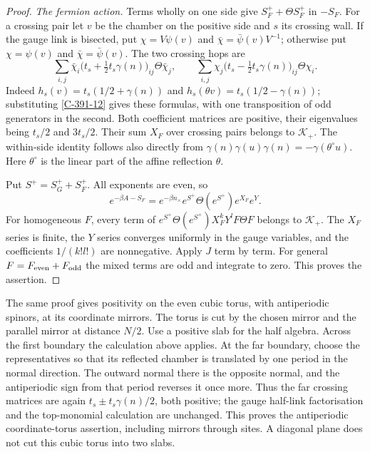 \documentclass[11pt,letterpaper,reqno]{amsart}
\theoremstyle{definition}
\theoremstyle{remark}
\begin{document}
\begin{proof}
\emph{The fermion action.}
Terms wholly on one side give $S_F^++\Theta S_F^+$ in $-S_F$.
For a crossing pair let $v$ be the chamber on the positive side
and $s$ its crossing wall. If the gauge link is bisected, put
$\chi=V\psi(v)$ and $\bar\chi=\bar\psi(v)V^{-1}$; otherwise
put $\chi=\psi(v)$ and $\bar\chi=\bar\psi(v)$.
The two crossing hops are
\[
 \sum_{i,j}\bar\chi_i\bigl(t_s+\tfrac12t_s\gamma(n)\bigr)_{ij}
                           \Theta\bar\chi_j,
 \qquad
 \sum_{i,j}\chi_j\bigl(t_s-\tfrac12t_s\gamma(n)\bigr)_{ij}
                           \Theta\chi_i.
\]
Indeed $h_s(v)=t_s(1/2+\gamma(n))$ and
$h_s(\theta v)=t_s(1/2-\gamma(n))$; substituting
\eqref{C-391-12} gives these formulas, with one transposition of
odd generators in the second. Both coefficient matrices are
positive, their eigenvalues being $t_s/2$ and $3t_s/2$.
Their sum $X_F$ over crossing pairs belongs to $\mathcal K_+$.
The within-side identity follows also directly from
$\gamma(n)\gamma(u)\gamma(n)=-\gamma(\theta^\circ u)$.
Here $\theta^\circ$ is the linear part of the affine reflection $\theta$.

Put $S^+=S_G^++S_F^+$. All exponents are even, so
\[
 e^{-\beta A-S_F}
       =e^{-\beta n_\times}e^{S^+}\Theta(e^{S^+})e^{X_F}e^Y.
\]
For homogeneous $F$, every term of
$e^{S^+}\Theta(e^{S^+})X_F^kY^lF\Theta F$ belongs to
$\mathcal K_+$. The $X_F$ series is finite, the $Y$ series
converges uniformly in the gauge variables, and the coefficients
$1/(k!l!)$ are nonnegative. Apply $J$ term by term.
For general $F=F_{\rm even}+F_{\rm odd}$ the mixed terms are
odd and integrate to zero. This proves the assertion.
\end{proof}

The same proof gives positivity on the even cubic torus, with
antiperiodic spinors, at its coordinate mirrors. The torus is cut
by the chosen mirror and the parallel mirror at distance $N/2$.
Use a positive slab for the half algebra. Across the first boundary
the calculation above applies. At the far boundary, choose the
representatives so that its reflected chamber is translated by
one period in the normal direction. The outward normal there is
the opposite normal, and the antiperiodic sign from that period
reverses it once more. Thus the far crossing matrices are again
$t_s\pm t_s\gamma(n)/2$, both positive; the gauge half-link
factorisation and the top-monomial calculation are unchanged.
\label{C-391-33}
This proves the antiperiodic coordinate-torus assertion,
including mirrors through sites.
A diagonal plane does not cut this cubic torus into two slabs.
\end{document}
